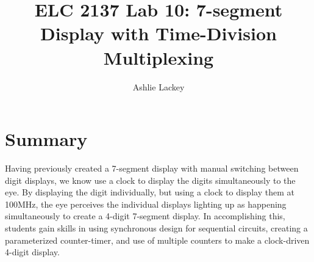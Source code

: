 \documentclass[11pt]{article}
\begin{document}
\title{ELC 2137 Lab 10: 7-segment Display with Time-Division Multiplexing}
\author{Ashlie Lackey}

\maketitle


\section*{Summary}

Having previously created a 7-segment display with manual switching between digit displays, we know use a clock to display the digits simultaneously to the eye. By displaying the digit individually, but using a clock to display them at 100MHz, the eye perceives the individual displays lighting up as happening simultaneously to create a 4-digit 7-segment display. In accomplishing this, students gain skills in using synchronous design for sequential circuits, creating a parameterized counter-timer, and use of multiple counters to make a clock-driven 4-digit display. 
\end{document}
